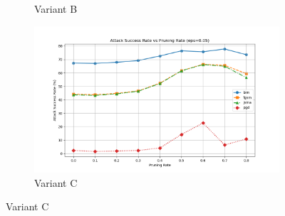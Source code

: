 \documentclass[preprint,12pt]{elsarticle}
\begin{document}
\begin{figure}[!t]
\begin{subfigure}[b]{0.24\columnwidth}
\caption{Variant B}
\label{fig:asr_no_afd_mfe_005_a}
\end{subfigure}
\hfill
\begin{subfigure}[b]{0.24\columnwidth}
\centering
\includegraphics[width=\columnwidth]{fig/asr-prunning/roct/roct_0.05_no_afd.png}
\caption{Variant C}
\label{fig:asr_no_afd_005_a}
\end{subfigure}


\end{figure}
\end{document}
